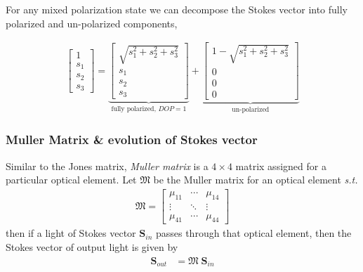 \documentclass[11pt,a4paper]{article}
\numberwithin{equation}{section}
\begin{document}
For any mixed polarization state we can decompose the Stokes vector into fully polarized and un-polarized components,

\begin{align}
	\begin{bmatrix} 1\\ s_1\\ s_2\\ s_3\end{bmatrix} = 
	\underbrace{\begin{bmatrix} \sqrt{s_1^2+s_2^2+s_3^2}\\ s_1\\ s_2\\ s_3\end{bmatrix}}_{\text{fully polarized, } DOP = 1} +
	\underbrace{\begin{bmatrix} 1-\sqrt{s_1^2+s_2^2+s_3^2}\\0\\ 0\\ 0\end{bmatrix}}_{\text{un-polarized}}
\end{align}

\subsubsection{Muller Matrix \& evolution of Stokes vector}

Similar to the Jones matrix, \textit{Muller matrix} is a $4\times4$ matrix assigned for a particular optical element. Let $\boldsymbol{\mathfrak{M}}$ be the Muller matrix for an optical element \textit{s.t.} 
\begin{align*}\boldsymbol{\mathfrak{M}}=
	\begin{bmatrix}
		\mu_{11} & \cdots & \mu_{14}\\
		\vdots & \ddots & \vdots\\
		\mu_{41} & \cdots & \mu_{44}
	\end{bmatrix}
\end{align*}
then if a light of Stokes vector $\boldsymbol{S}_{in}$ passes through that optical element, then the Stokes vector of output light is given by 
\begin{align}
	\boldsymbol{S}_{out}&=\boldsymbol{\mathfrak{M}}\;\boldsymbol{S}_{in}\label{eq:1.33}
\end{align}
\end{document}
